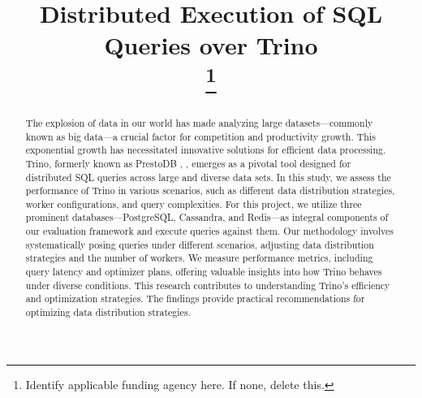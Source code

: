 \documentclass[conference]{IEEEtran}
\begin{document}
\title{Distributed Execution of SQL Queries over Trino \\
    \thanks{Identify applicable funding agency here. If none, delete this.}
}

\author{
    \and
}

\maketitle

\begin{abstract}

    The explosion of data in our world has made analyzing large datasets—commonly known as big data—a
    crucial factor for competition and productivity growth. This exponential growth has necessitated
    innovative solutions for efficient data processing. Trino, formerly known as PrestoDB \cite{b1}, \cite{b2}, emerges as
    a pivotal tool designed for distributed SQL queries across large and diverse data sets. In this
    study, we assess the performance of Trino in various scenarios, such as different data distribution
    strategies,  worker configurations, and query complexities. For this project, we utilize three
    prominent databases—PostgreSQL, Cassandra, and Redis—as integral components of our evaluation
    framework and execute queries against them. Our methodology involves systematically posing queries
    under different scenarios, adjusting data distribution strategies and the number of workers. We
    measure performance metrics, including query latency and optimizer plans, offering valuable insights
    into how Trino behaves under diverse conditions. This research contributes to understanding Trino's
    efficiency and optimization strategies. The findings provide practical recommendations for optimizing
    data distribution strategies.

\end{abstract}
\end{document}
